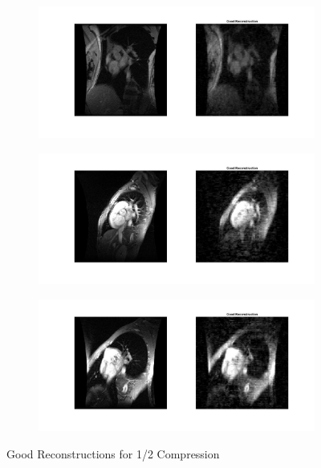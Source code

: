 \documentclass[a4paper]{article}
\begin{document}
\begin{figure}[h]
\begin{subfigure}{.5\textwidth}
  \centering
  \includegraphics[width = 6in]{good21.jpg}
  \label{fig:sfig1}
\end{subfigure}%

\begin{subfigure}{.5\textwidth}
  \centering
  \includegraphics[width = 6in]{good22.jpg}
  \label{fig:sfig2}
\end{subfigure}

\begin{subfigure}{.5\textwidth}
  \centering
  \includegraphics[width = 6in]{good23.jpg}
  \label{fig:sfig2}
\end{subfigure}
\caption{Good Reconstructions for 1/2 Compression}
\end{figure}
\end{document}
